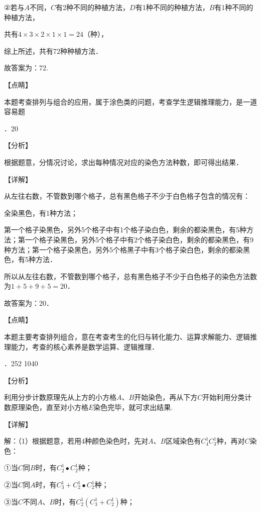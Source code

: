 \documentclass[a4paper,11pt,UTF8,twoside]{ctexart} %
\begin{document}
\noindent $\mathrm{\textrm{②}}$若与$A$不同，$C$有2种不同的种植方法，$D$有1种不同的种植方法，$B$有1种不同的种植方法，

\noindent 共有$4\times 3\times 2\times 1\times 1=24$（种），

\noindent 综上所述，共有72种种植方法．

\noindent 故答案为：72.

\noindent 【点睛】

\noindent 本题考查排列与组合的应用，属于涂色类的问题，考查学生逻辑推理能力，是一道容易题

．20

\noindent 【分析】

\noindent 根据题意，分情况讨论，求出每种情况对应的染色方法种数，即可得出结果．

\noindent 【详解】

\noindent 从左往右数，不管数到哪个格子，总有黑色格子不少于白色格子包含的情况有：

\noindent 全染黑色，有1种方法；

\noindent 第一个格子染黑色，另外5个格子中有1个格子染白色，剩余的都染黑色，有5种方法；第一个格子染黑色，另外5个格子中有2个格子染白色，剩余的都染黑色，有9种方法；第一个格子染黑色，另外5个格黑子中有3个格子染白色，剩余的都染黑色，有5种方法．

\noindent 所以从左往右数，不管数到哪个格子，总有黑色格子不少于白色格子的染色方法数为$1+5+9+5=20$．

\noindent 故答案为：$20$．

\noindent 【点睛】

\noindent 本题主要考查排列组合，意在考查考生的化归与转化能力、运算求解能力、逻辑推理能力，考查的核心素养是数学运算、逻辑推理．

．252    1040    

\noindent 【分析】

\noindent 利用分步计数原理先从上方的小方格$A$、$B$开始染色，再从下方$C$开始利用分类计数原理染色，直至对小方格$E$染色完毕，就可求出结果.

\noindent 【详解】

\noindent 解：（1）根据题意，若用4种颜色染色时，先对$A$、$B$区域染色有$C_{4}^{1} C_{3}^{1} $种，再对$C$染色：

\noindent ①当$C$同$B$时，有$C_{2}^{1} \bullet C_{2}^{1} $种；

\noindent ②当$C$同$A$时，有$C_{3}^{1} +C_{2}^{1} \bullet C_{2}^{1} $种；

\noindent ③当$C$不同$A$、$B$时，有$C_{2}^{1} (C_{3}^{1} +C_{2}^{1} )$种；
\end{document}
